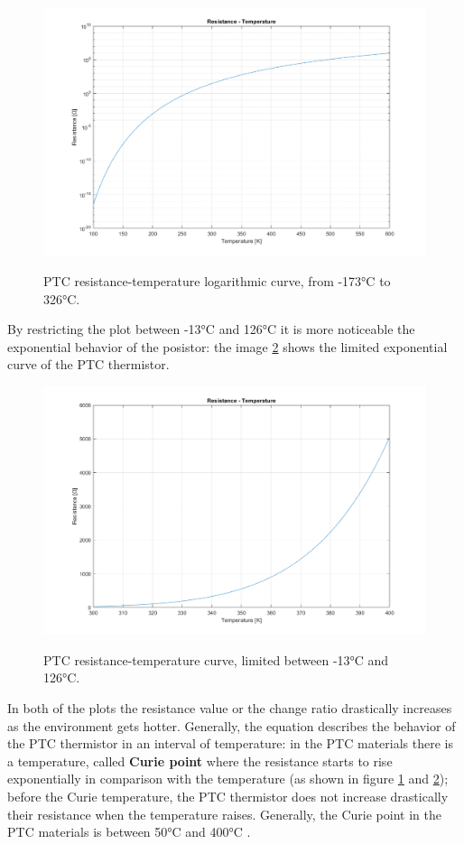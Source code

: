 \begin{figure}[h]
    \centering
    \includegraphics[width = .75\textwidth]{../res/plots/PTC_logarithmic.png}
    \label{fig:PTC_logarithmic}
    \caption{PTC resistance-temperature logarithmic curve, from -173°C to 326°C.}
\end{figure}

\FloatBarrier\noindent By restricting the plot between -13°C and 126°C it is more noticeable the exponential behavior of the posistor: the image \ref{fig:PTC_cartesian} shows the limited exponential curve of the PTC thermistor.

\begin{figure}[h]
    \centering
    \includegraphics[width = .75\textwidth]{../res/plots/PTC_cartesian.png}
    \label{fig:PTC_cartesian}
    \caption{PTC resistance-temperature curve, limited between -13°C and 126°C.}
\end{figure}

\FloatBarrier\noindent In both of the plots the resistance value or the change ratio drastically increases as the environment gets hotter. Generally, the equation describes the behavior of the PTC thermistor in an interval of temperature: in the PTC materials there is a temperature, called \textbf{Curie point} where the resistance starts to rise exponentially in comparison with the temperature (as shown in figure \ref{fig:PTC_logarithmic} and \ref{fig:PTC_cartesian}); before the Curie temperature, the PTC thermistor does not increase drastically their resistance when the temperature raises. Generally, the Curie point in the PTC materials is between 50°C and 400°C \cite{Cheng2014441}.

